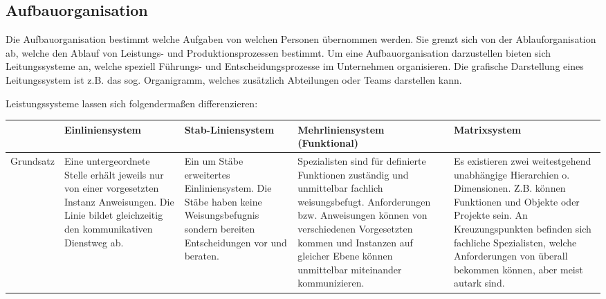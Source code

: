 \subsection{Aufbauorganisation}
Die Aufbauorganisation bestimmt welche Aufgaben von welchen Personen übernommen werden. Sie grenzt sich von der Ablauforganisation ab, welche den Ablauf von Leistungs- und Produktionsprozessen bestimmt. Um eine Aufbauorganisation darzustellen bieten sich Leitungssysteme an, welche speziell Führungs- und Entscheidungsprozesse im Unternehmen organisieren. Die grafische Darstellung eines Leitungssystem ist z.B. das sog. Organigramm, welches zusätzlich Abteilungen oder Teams darstellen kann.

Leistungssysteme lassen sich folgendermaßen differenzieren:

\begin{table}[H]
    \centering
    \begin{tabularx}{\textwidth}{|c|X|X|X|X|}
        \hline
                   & Einliniensystem                                                                                                                                          & Stab-Liniensystem                                                                                                                 & Mehrliniensystem (Funktional)                                                                                                                                                                                                                             & Matrixsystem                                                                                                                                                                                                                                                        \\
        \hline
        Grundsatz  & Eine untergeordnete Stelle erhält jeweils nur von einer vorgesetzten Instanz Anweisungen. Die Linie bildet gleichzeitig den kommunikativen Dienstweg ab. & Ein um Stäbe erweitertes Einliniensystem. Die Stäbe haben keine Weisungsbefugnis sondern bereiten Entscheidungen vor und beraten. & Spezialisten sind für definierte Funktionen zuständig und unmittelbar fachlich weisungsbefugt. Anforderungen bzw. Anweisungen können von verschiedenen Vorgesetzten kommen und Instanzen auf gleicher Ebene können unmittelbar miteinander kommunizieren. & Es existieren zwei weitestgehend unabhängige Hierarchien o. Dimensionen. Z.B. können Funktionen und Objekte oder Projekte sein. An Kreuzungspunkten befinden sich fachliche Spezialisten, welche Anforderungen von überall bekommen können, aber meist autark sind. \\

\end{tabularx}
\end{table}
